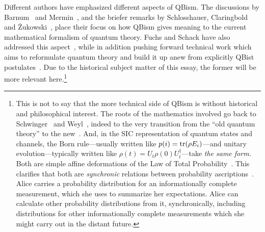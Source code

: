 \documentclass[aps,pra,superscriptaddress,12pt,tightenlines,nofootinbib]{revtex4-2}
\newcommand{\tr}{\hbox{tr}}
\begin{document}
Different authors have emphasized different aspects of QBism.  The
discussions by Barnum~\cite{Barnum2010} and Mermin~\cite{MerminPT,
  Mermin14, Mermin14b, Mermin-Vienna, Mermin-Bell}, and the briefer
remarks by Schlosshauer, Claringbold and
\.{Z}ukowski~\cite{Schlosshauer2014, Zukowski2015}, place their focus
on how QBism gives meaning to the current mathematical formalism of
quantum theory.  Fuchs and Schack have also addressed this
aspect~\cite{FuchsSchack2011}, while in addition pushing forward
technical work which aims to reformulate quantum theory and build it
up anew from explicitly QBist postulates~\cite{RMP}.  Due to the
historical subject matter of this essay, the former will be more
relevant here.\footnote{This is not to say that the more technical
  side of QBism is without historical and philosophical interest.  The
  roots of the mathematics involved go back to
  Schwinger~\cite{Schwinger1960} and Weyl~\cite[\S IV.D.14]{Weyl1931},
  indeed to the very transition from the ``old quantum theory'' to the
  new~\cite[pp.\ 2055--56, 2257--58, 2280]{Fuchs2014}.  And, in the
  SIC representation of quantum states and channels, the Born
  rule---usually written like $p(i) = \tr(\rho E_i)$---and unitary
  evolution---typically written like $\rho(t) = U_t \rho(0)
  U_t^\dag$---take \emph{the same form.}  Both are simple affine
  deformations of the Law of Total Probability~\cite{RMP}.  This
  clarifies that both are \emph{synchronic} relations between
  probability ascriptions~\cite{FuchsSchack2011}.  Alice carries a
  probability distribution for an informationally complete
  measurement, which she uses to summarize her expectations.  Alice
  can calculate other probability distributions from it,
  synchronically, including distributions for other informationally
  complete measurements which she might carry out in the distant
  future.}
\end{document}
